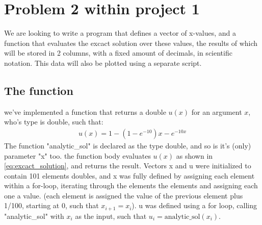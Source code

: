 \documentclass{article}
\begin{document}
\section{Problem 2 within project 1}
We are looking to write a program that defines a vector of x-values, and a function that evaluates the excact solution over these values, the results of which
will be stored in 2 columns, with a fixed amount of decimals, in scientific notation. This data will also be plotted  using a separate script.
\subsection*{The function}
we've implemented a function that returns a double $u(x)$ for an argument $x$, who's type is double, such that:
\begin{align}    
    \label{eq:excact_solution}
    u(x) =  1 - (1-e^{-10})x - e^{-10x}
\end{align}
The function "analytic\_sol" is declared as the type double, and so is it's (only) parameter "x" too. the function body evaluates $u(x)$ as shown in \ref{eq:excact_solution}, and returns the
result. Vectors x and u were initialized to contain 101 elements doubles, and x was fully defined by assigning each element within a for-loop, iterating through the elements the elements and
assigning each one a value. (each element is assigned the value of the previous element plus 1/100, starting at 0, such that $x_{i+1} = x_i$). u was defined using a for loop, 
calling "analytic\_sol" with $x_i$ as the input, such that $u_{i} = \text{analytic\_sol}(x_i)$.
\end{document}
